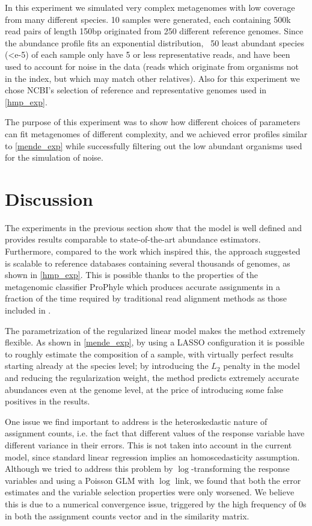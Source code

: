 In this experiment we simulated very complex metagenomes with low coverage from many different species. 10 samples were generated, each containing 500k read pairs of length 150bp originated from 250 different reference genomes. Since the abundance profile fits an exponential distribution, ~50 least abundant species (<e-5) of each sample only have 5 or less representative reads, and have been used to account for noise in the data (reads which originate from organisms not in the index, but which may match other relatives). Also for this experiment we chose NCBI's selection of reference and representative genomes used in \ref{hmp_exp}.

The purpose of this experiment was to show how different choices of parameters can fit metagenomes of different complexity, and we achieved error profiles similar to \ref{mende_exp} while successfully filtering out the low abundant organisms used for the simulation of noise.

\section{Discussion}

The experiments in the previous section show that the model is well defined and provides results comparable to state-of-the-art abundance estimators. Furthermore, compared to the work which inspired this\cite{lindner_metagenomic_2013}, the approach suggested is scalable to reference databases containing several thousands of genomes, as shown in \ref{hmp_exp}. This is possible thanks to the properties of the metagenomic classifier ProPhyle which produces accurate assignments in a fraction of the time required by traditional read alignment methods as those included in \cite{lindner_metagenomic_2013}.

The parametrization of the regularized linear model makes the method extremely flexible. As shown in \ref{mende_exp}, by using a LASSO configuration it is possible to roughly estimate the composition of a sample, with virtually perfect results starting already at the species level; by introducing the $L_2$ penalty in the model and reducing the regularization weight, the method predicts extremely accurate abundances even at the genome level, at the price of introducing some false positives in the results.

One issue we find important to address is the heteroskedastic nature of assignment counts, i.e. the fact that different values of the response variable have different variance in their errors. This is not taken into account in the current model, since standard linear regression implies an homoscedasticity assumption. Although we tried to address this problem by $\log$-transforming the response variables and using a Poisson GLM with $\log$ link, we found that both the error estimates and the variable selection properties were only worsened. We believe this is due to a numerical convergence issue, triggered by the high frequency of 0s in both the assignment counts vector and in the similarity matrix.

